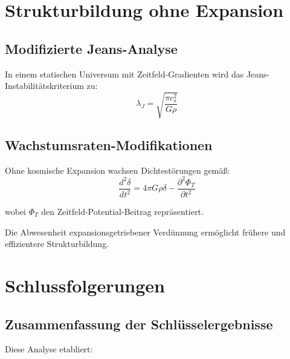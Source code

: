 \documentclass[12pt,a4paper]{article}
\begin{document}
	\section{Strukturbildung ohne Expansion}
	\label{sec:strukturbildung}
	
	\subsection{Modifizierte Jeans-Analyse}
	\label{subsec:jeans_analyse}
	
	In einem statischen Universum mit Zeitfeld-Gradienten wird das Jeans-Instabilitätskriterium zu:
	\begin{equation}
		\lambda_J = \sqrt{\frac{\pi c_s^2}{G \rho}}
	\end{equation}
	
	\subsection{Wachstumsraten-Modifikationen}
	\label{subsec:wachstumsraten_modifikationen}
	
	Ohne kosmische Expansion wachsen Dichtestörungen gemäß:
	\begin{equation}
		\frac{d^2 \delta}{dt^2} = 4\pi G \rho \delta - \frac{\partial^2 \Phi_T}{\partial t^2}
	\end{equation}
	
	wobei $\Phi_T$ den Zeitfeld-Potential-Beitrag repräsentiert.
	
	Die Abwesenheit expansionsgetriebener Verdünnung ermöglicht frühere und effizientere Strukturbildung.
	
	\section{Schlussfolgerungen}
	\label{sec:schlussfolgerungen}
	
	\subsection{Zusammenfassung der Schlüsselergebnisse}
	\label{subsec:schluesselergebnisse}
	
	Diese Analyse etabliert:
	
\end{document}

